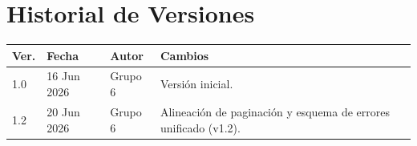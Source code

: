 \documentclass[11pt, a4paper]{article}
\begin{document}
\section{Historial de Versiones}

\begin{table}[ht!]
\centering
\begin{tabularx}{\textwidth}{l l l X}
  \toprule
  \textbf{Ver.} & \textbf{Fecha} & \textbf{Autor} & \textbf{Cambios} \\
  \midrule
  1.0 & 16 Jun 2026 & Grupo 6 & Versión inicial. \\
  1.2 & 20 Jun 2026 & Grupo 6 & Alineación de paginación y esquema de errores unificado (v1.2). \\
  \bottomrule
\end{tabularx}
\end{table}
\end{document}
